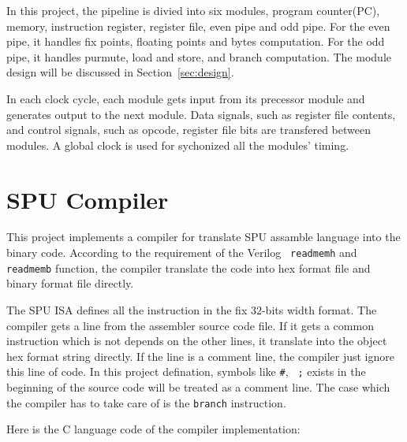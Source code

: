 \documentclass[preprint,authoryear,12pt]{elsarticle}
\begin{document}
In this project, the pipeline is divied into six modules, program
counter(PC), memory, instruction register, register file, even pipe
and odd pipe. For the even pipe, it handles fix points, floating
points and bytes computation. For the odd pipe, it handles purmute,
load and store, and branch computation. The module design will be
discussed in Section~\ref{sec:design}.

In each clock cycle, each module gets input from its precessor module
and generates output to the next module. Data signals, such as
register file contents, and control signals, such as opcode, register
file bits are transfered between modules. A global clock is used for
sychonized all the modules' timing.


\section{SPU Compiler}\label{sec:compiler}

This project implements a compiler for translate SPU assamble language
into the binary code. According to the requirement of the Verilog {\tt
  readmemh} and {\tt readmemb} function, the compiler translate the
code into hex format file and binary format file directly.

The SPU ISA defines all the instruction in the fix 32-bits width
format. The compiler gets a line from the assembler source code
file. If it gets a common instruction which is not depends on the
other lines, it translate into the object hex format string
directly. If the line is a comment line, the compiler just ignore this
line of code. In this project defination, symbols like {\tt \#}, {\tt
  ;} exists in the beginning of the source code will be treated as a
comment line. The case which the compiler has to take care of is the
{\tt branch} instruction.

Here is the C language code of the compiler implementation:
\end{document}
